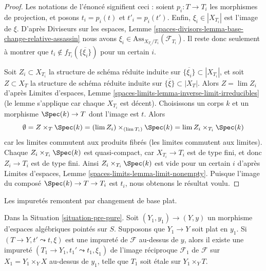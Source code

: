 \begin{proof}
Les notations de l'énoncé signifient ceci : soient $p_i : T \to T_i$
les morphismes de projection, et posons $t_i = p_i(t)$ et $t'_i = p_i(t')$.
Enfin, $\xi_i \in |X_{T_i}|$ est l'image de $\xi$. D'après
Diviseurs sur les espaces, Lemme
\ref{spaces-divisors-lemma-base-change-relative-assassin}
nous avons $\xi_i \in \text{Ass}_{X_{T_i}/T_i}(\mathcal{F}_{T_i})$.
Il reste donc seulement à montrer que
$t_i \not \in f_{T_i}(\overline{\{\xi_i\}})$ pour un certain $i$.

\medskip\noindent
Soit $Z_i \subset X_{T_i}$ la structure de schéma réduite induite
sur $\overline{\{\xi_i\}} \subset |X_{T_i}|$,
et soit $Z \subset X_T$ la structure de schéma réduite induite sur
$\overline{\{\xi\}} \subset |X_T|$.
Alors $Z = \lim Z_i$ d'après
Limites d'espaces, Lemme \ref{spaces-limits-lemma-inverse-limit-irreducibles}
(le lemme s'applique car chaque $X_{T_i}$ est décent).
Choisissons un corps $k$ et un morphisme $\Spec(k) \to T$ dont l'image est $t$.
Alors
$$
\emptyset =
Z \times_T \Spec(k) = (\lim Z_i) \times_{(\lim T_i)} \Spec(k)
= \lim Z_i \times_{T_i} \Spec(k)
$$
car les limites commutent aux produits fibrés (les limites commutent aux limites).
Chaque $Z_i \times_{T_i} \Spec(k)$ est quasi-compact, car $X_{T_i} \to T_i$
est de type fini, et donc $Z_i \to T_i$ est de type fini.
Ainsi $Z_i \times_{T_i} \Spec(k)$ est vide pour un certain $i$ d'après
Limites d'espaces, Lemme \ref{spaces-limits-lemma-limit-nonempty}.
Puisque l'image du composé $\Spec(k) \to T \to T_i$ est $t_i$,
nous obtenons le résultat voulu.
\end{proof}

\noindent
Les impuretés remontent par changement de base plat.

\begin{lemma}
\label{lemma-flat-ascent-impurity}
Dans la Situation \ref{situation-pre-pure}.
Soit $(Y_1, y_1) \to (Y, y)$ un morphisme d'espaces algébriques
pointés sur $S$. Supposons que $Y_1 \to Y$ soit plat en $y_1$.
Si $(T \to Y, t' \leadsto t, \xi)$ est une impureté de
$\mathcal{F}$ au-dessus de $y$, alors il existe une impureté
$(T_1 \to Y_1, t_1' \leadsto t_1, \xi_1)$ de l'image réciproque
$\mathcal{F}_1$ de $\mathcal{F}$ sur $X_1 = Y_1 \times_Y X$
au-dessus de $y_1$, telle que $T_1$ soit \'etale sur $Y_1 \times_Y T$.
\end{lemma}

